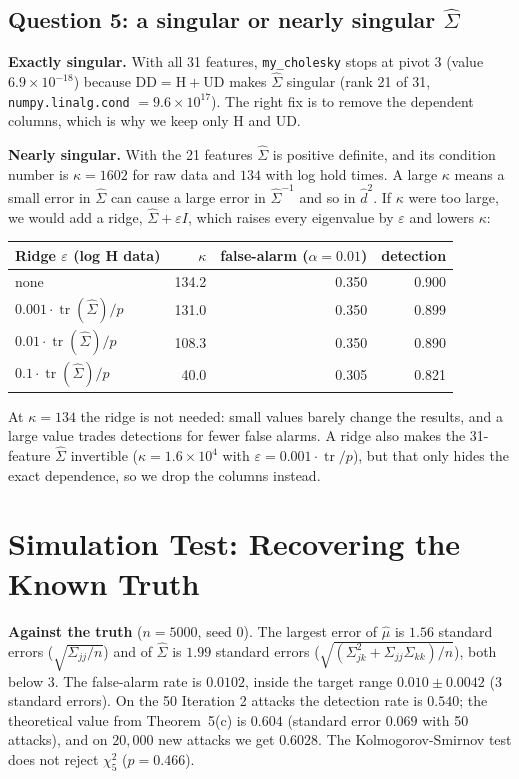 \documentclass[11pt]{article}
\newcommand{\hSigma}{\hat{\Sigma}}
\newcommand{\hmu}{\hat{\mu}}
\newcommand{\code}[1]{\texttt{#1}}
\theoremstyle{plain}
\begin{document}
\subsection{Question 5: a singular or nearly singular $\hSigma$}
\textbf{Exactly singular.} With all 31 features, \code{my\_cholesky} stops at pivot 3
(value $6.9\times10^{-18}$) because $\text{DD}=\text{H}+\text{UD}$ makes $\hSigma$ singular
(rank 21 of 31, \code{numpy.linalg.cond} $=9.6\times10^{17}$). The right fix is to remove
the dependent columns, which is why we keep only H and UD.

\textbf{Nearly singular.} With the 21 features $\hSigma$ is positive definite, and its
condition number is $\kappa=1602$ for raw data and $134$ with log hold times. A large
$\kappa$ means a small error in $\hSigma$ can cause a large error in $\hSigma^{-1}$ and so
in $\hat d^2$. If $\kappa$ were too large, we would add a ridge, $\hSigma+\varepsilon I$,
which raises every eigenvalue by $\varepsilon$ and lowers $\kappa$:

\begin{table}[H]
\centering\small
\begin{tabular}{@{}lrrr@{}}
\toprule
Ridge $\varepsilon$ (log H data) & $\kappa$ & false-alarm ($\alpha=0.01$) & detection\\
\midrule
none & 134.2 & 0.350 & 0.900\\
$0.001\cdot\operatorname{tr}(\hSigma)/p$ & 131.0 & 0.350 & 0.899\\
$0.01\cdot\operatorname{tr}(\hSigma)/p$ & 108.3 & 0.350 & 0.890\\
$0.1\cdot\operatorname{tr}(\hSigma)/p$ & 40.0 & 0.305 & 0.821\\
\bottomrule
\end{tabular}
\end{table}
At $\kappa=134$ the ridge is not needed: small values barely change the results, and a
large value trades detections for fewer false alarms. A ridge also makes the 31-feature
$\hSigma$ invertible ($\kappa=1.6\times10^4$ with $\varepsilon=0.001\cdot\operatorname{tr}/p$),
but that only hides the exact dependence, so we drop the columns instead.

\section{Simulation Test: Recovering the Known Truth}\label{sec:sim}

\textbf{Against the truth} ($n=5000$, seed 0). The largest error of $\hmu$ is $1.56$
standard errors ($\sqrt{\Sigma_{jj}/n}$) and of $\hSigma$ is $1.99$ standard errors
($\sqrt{(\Sigma_{jk}^2+\Sigma_{jj}\Sigma_{kk})/n}$), both below 3. The false-alarm rate is
$0.0102$, inside the target range $0.010\pm0.0042$ (3 standard errors). On the 50
Iteration 2 attacks the detection rate is $0.540$; the theoretical value from
Theorem~5(c) is $0.604$ (standard error $0.069$ with 50 attacks), and on $20{,}000$ new
attacks we get $0.6028$. The Kolmogorov-Smirnov test does not reject $\chi^2_5$
($p=0.466$).
\end{document}
